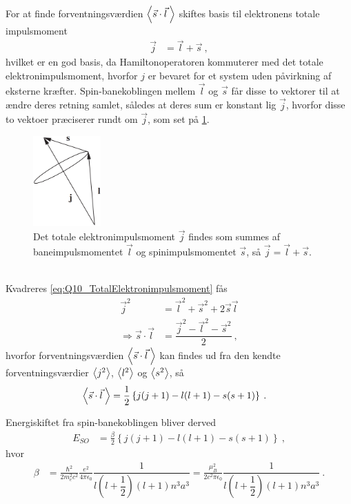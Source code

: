 For at finde forventningsværdien $\Braket{\Vec{s} \cdot \Vec{l} \: }$ skiftes basis til elektronens totale impulsmoment
\begin{align} \label{eq:Q10_TotalElektronimpulsmoment}
    \Vec{j} &= \Vec{l} + \Vec{s} \: ,
\end{align}
hvilket er en god basis, da Hamiltonoperatoren kommuterer med det totale elektronimpulsmoment, hvorfor $j$ er bevaret for et system uden påvirkning af eksterne kræfter. Spin-banekoblingen mellem $\Vec{l}$ og $\Vec{s}$ får disse to vektorer til at ændre deres retning samlet, således at deres sum er konstant lig $\Vec{j}$, hvorfor disse to vektoer præciserer rundt om $\Vec{j}$, som set på \cref{fig:Q10_TotalElektronimpulsmoment}.
\begin{figure}[!h]
    \centering
    \includegraphics[width=0.23\textwidth]{Q10/images/AtomicQuantumNumberJ.PNG}
    \caption{Det totale elektronimpulsmoment $\Vec{j}$ findes som summes af baneimpulsmomentet $\Vec{l}$ og spinimpulsmomentet $\Vec{s}$, så $\Vec{j} = \Vec{l} + \Vec{s}$.}
    \label{fig:Q10_TotalElektronimpulsmoment}
\end{figure}\\
Kvadreres \cref{eq:Q10_TotalElektronimpulsmoment} fås
\begin{align}
    \Vec{j}^2 &= \Vec{l}^2 + \Vec{s}^2 + 2\Vec{s}\Vec{l} \nonumber\\
    \Rightarrow \Vec{s} \cdot \Vec{l} &= \dfrac{\Vec{j}^2 - \Vec{l}^2 - \Vec{s}^2}{2} \: ,
\end{align}
hvorfor forventningsværdien $\Braket{\Vec{s} \cdot \Vec{l} \: }$ kan findes ud fra den kendte forventningsværdier $\Braket{j^2}$, $\Braket{l^2}$ og $\Braket{s^2}$, så
\begin{align}
    \Braket{\Vec{s} \cdot \Vec{l} \: } &= \frac{1}{2}\left\{j(j+1) - l(l+1) - s(s+1)\right\} \: .
\end{align}

Energiskiftet fra spin-banekoblingen bliver derved
\begin{align} \label{eq:Q10_EnergiskiftSpinOrbitForHydrogen}
    E_{SO} &= \frac{\beta}{2} \left\{j(j+1) - l(l+1) - s(s+1)\right\} \: ,
\end{align}
hvor
\begin{align}
    \beta &= \frac{\hbar^2}{2m_e^2c^2} \frac{e^2}{4\pi\epsilon_0} \dfrac{1}{l\left(l+\dfrac{1}{2}\right)\left(l + 1\right) n^3a^3} = \frac{\mu_B^2}{2c^2\pi\epsilon_0} \dfrac{1}{l\left(l+\dfrac{1}{2}\right)\left(l + 1\right) n^3a^3} \: .
\end{align}

